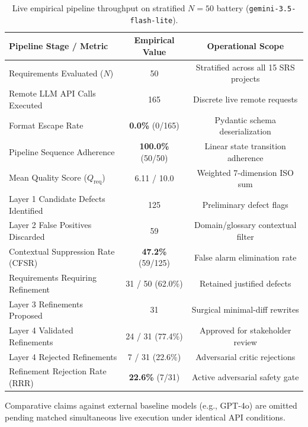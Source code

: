 \documentclass[journal]{IEEEtran}
\begin{document}
\begin{table}[htbp]
\centering
\caption{Live empirical pipeline throughput on stratified $N=50$ battery (\texttt{gemini-3.5-flash-lite}).}
\label{tab:baseline}
\small
\setlength{\tabcolsep}{4pt}
\begin{tabularx}{\columnwidth}{@{}>{\raggedright\arraybackslash}Xcc@{}}
\toprule
\textbf{Pipeline Stage / Metric} & \textbf{Empirical Value} & \textbf{Operational Scope} \\
\midrule
Requirements Evaluated ($N$)            & 50                       & Stratified across all 15 SRS projects \\
Remote LLM API Calls Executed          & 165                      & Discrete live remote requests \\
Format Escape Rate                      & \textbf{0.0\%} (0/165)   & Pydantic schema deserialization \\
Pipeline Sequence Adherence             & \textbf{100.0\%} (50/50) & Linear state transition adherence \\
Mean Quality Score ($Q_{\text{req}}$)   & 6.11 / 10.0              & Weighted 7-dimension ISO sum \\
Layer 1 Candidate Defects Identified    & 125                      & Preliminary defect flags \\
Layer 2 False Positives Discarded       & 59                       & Domain/glossary contextual filter \\
Contextual Suppression Rate (CFSR)      & \textbf{47.2\%} (59/125) & False alarm elimination rate \\
Requirements Requiring Refinement       & 31 / 50 (62.0\%)         & Retained justified defects \\
Layer 3 Refinements Proposed            & 31                       & Surgical minimal-diff rewrites \\
Layer 4 Validated Refinements           & 24 / 31 (77.4\%)         & Approved for stakeholder review \\
Layer 4 Rejected Refinements            & 7 / 31 (22.6\%)          & Adversarial critic rejections \\
Refinement Rejection Rate (RRR)         & \textbf{22.6\%} (7/31)   & Active adversarial safety gate \\
\bottomrule
\end{tabularx}
\vspace{1ex}
\raggedright\footnotesize
Comparative claims against external baseline models (e.g., GPT-4o) are omitted pending matched simultaneous live execution under identical API conditions.
\end{table}
\end{document}
